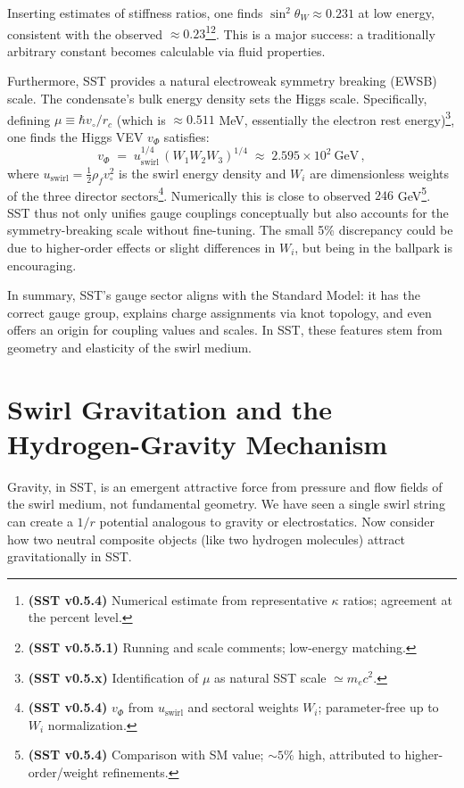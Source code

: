 \documentclass[reprint,aps,onecolumn,nofootinbib]{revtex4-2}
\begin{document}
        \noindent Inserting estimates of stiffness ratios, one finds $\sin^2\theta_W \approx 0.231$ at low energy, consistent with the observed $\approx0.23$\footnote{\textbf{(SST v0.5.4)} Numerical estimate from representative $\kappa$ ratios; agreement at the percent level.}\footnote{\textbf{(SST v0.5.5.1)} Running and scale comments; low-energy matching.}. This is a major success: a traditionally arbitrary constant becomes calculable via fluid properties.

        Furthermore, SST provides a natural electroweak symmetry breaking (EWSB) scale. The condensate’s bulk energy density sets the Higgs scale. Specifically, defining $\mu \equiv \hbar v_{\circ}/r_c$ (which is $\approx0.511$ MeV, essentially the electron rest energy)\footnote{\textbf{(SST v0.5.x)} Identification of $\mu$ as natural SST scale $\simeq m_e c^2$.}, one finds the Higgs VEV $v_{\Phi}$ satisfies:
        \[
            v_{\Phi} \;=\; u_{\text{swirl}}^{1/4}\,(W_1 W_2 W_3)^{1/4} \;\approx\; 2.595\times 10^2~\text{GeV}\,,
        \]
        where $u_{\text{swirl}} = \frac{1}{2}\rho_f v_{\circ}^2$ is the swirl energy density and $W_i$ are dimensionless weights of the three director sectors\footnote{\textbf{(SST v0.5.4)} $v_\Phi$ from $u_{\text{swirl}}$ and sectoral weights $W_i$; parameter-free up to $W_i$ normalization.}. Numerically this is close to observed $246$ GeV\footnote{\textbf{(SST v0.5.4)} Comparison with SM value; $\sim5\%$ high, attributed to higher-order/weight refinements.}. SST thus not only unifies gauge couplings conceptually but also accounts for the symmetry-breaking scale without fine-tuning. The small 5\% discrepancy could be due to higher-order effects or slight differences in $W_i$, but being in the ballpark is encouraging.

        In summary, SST’s gauge sector aligns with the Standard Model: it has the correct gauge group, explains charge assignments via knot topology, and even offers an origin for coupling values and scales. In SST, these features stem from geometry and elasticity of the swirl medium.

\section{Swirl Gravitation and the Hydrogen-Gravity Mechanism}
    Gravity, in SST, is an emergent attractive force from pressure and flow fields of the swirl medium, not fundamental geometry. We have seen a single swirl string can create a $1/r$ potential analogous to gravity or electrostatics. Now consider how two neutral composite objects (like two hydrogen molecules) attract gravitationally in SST.
\end{document}

